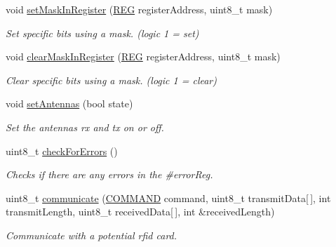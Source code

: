 \begin{DoxyCompactItemize}
void \mbox{\hyperlink{class_m_f_r_c522_ae30686cdd50f6fdb821908a2547e5153}{set\+Mask\+In\+Register}} (\mbox{\hyperlink{class_m_f_r_c522_ae7ec09eb8c9c61288a4770175b4b8db7}{R\+EG}} register\+Address, uint8\+\_\+t mask)
\begin{DoxyCompactList}\small\item\em Set specific bits using a mask. (logic 1 = set) \end{DoxyCompactList}\item 
void \mbox{\hyperlink{class_m_f_r_c522_a9935264b559702a3a4ad2b87735b4f8f}{clear\+Mask\+In\+Register}} (\mbox{\hyperlink{class_m_f_r_c522_ae7ec09eb8c9c61288a4770175b4b8db7}{R\+EG}} register\+Address, uint8\+\_\+t mask)
\begin{DoxyCompactList}\small\item\em Clear specific bits using a mask. (logic 1 = clear) \end{DoxyCompactList}\item 
void \mbox{\hyperlink{class_m_f_r_c522_ad33cc8218440b30747fba97aa59c0583}{set\+Antennas}} (bool state)
\begin{DoxyCompactList}\small\item\em Set the antennas rx and tx on or off. \end{DoxyCompactList}\item 
uint8\+\_\+t \mbox{\hyperlink{class_m_f_r_c522_a6d831a60a08c5f37a264c61f7c79c372}{check\+For\+Errors}} ()
\begin{DoxyCompactList}\small\item\em Checks if there are any errors in the \#error\+Reg. \end{DoxyCompactList}\item 
uint8\+\_\+t \mbox{\hyperlink{class_m_f_r_c522_ab605cd58a59f1d6cbc48ef0be252e593}{communicate}} (\mbox{\hyperlink{class_m_f_r_c522_abf038692c9cf33ed59b44a612e6ed1c7}{C\+O\+M\+M\+A\+ND}} command, uint8\+\_\+t transmit\+Data\mbox{[}$\,$\mbox{]}, int transmit\+Length, uint8\+\_\+t received\+Data\mbox{[}$\,$\mbox{]}, int \&received\+Length)
\begin{DoxyCompactList}\small\item\em Communicate with a potential rfid card. \end{DoxyCompactList}\end{DoxyCompactItemize}

